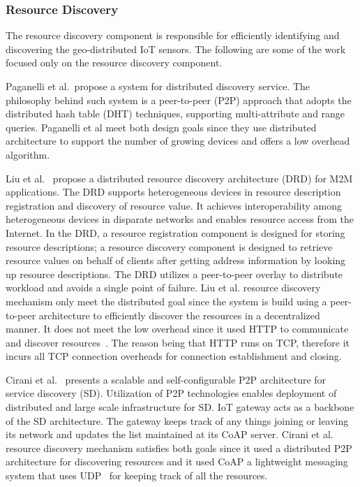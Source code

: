 


\subsubsection{Resource Discovery}
The resource discovery component is responsible for efficiently identifying and discovering the geo-distributed IoT sensors. 
The following are some of the work focused only on the resource discovery component. 

Paganelli et al.~\cite{article}propose a system for distributed discovery service. The philosophy behind such system is a peer-to-peer (P2P) approach that adopts the distributed hash table (DHT) techniques, supporting multi-attribute and range queries. Paganelli et al meet both design goals since they use distributed architecture to support the number of growing devices and offers a low overhead algorithm.

Liu et al.~\cite{6680268} propose a distributed resource discovery architecture (DRD) for M2M applications. The DRD supports
heterogeneous devices in resource description registration and discovery of resource value. It achieves interoperability among
heterogeneous devices in disparate networks and enables resource access from the Internet. In the DRD, a resource registration component is designed for storing resource descriptions; a resource discovery component is designed to retrieve resource values on behalf of clients after getting address information by looking up resource descriptions. The DRD utilizes a peer-to-peer overlay to distribute workload and avoids a single point of failure. Liu et al. resource discovery mechanism only meet the distributed goal since the system is build using a peer-to-peer architecture to efficiently discover the resources in a decentralized manner. It does not meet the low overhead since it used HTTP to communicate and discover resources~\cite{8088251}. The reason being that HTTP runs on TCP, therefore it incurs all TCP connection overheads for connection establishment and closing.

Cirani et al.~\cite{6899579} presents a scalable and self-configurable P2P architecture for service discovery (SD). Utilization of
P2P technologies enables deployment of distributed and large scale infrastructure for SD. IoT gateway acts as a backbone of the SD architecture. The gateway keeps track of any things joining or leaving its network and updates the list maintained at its CoAP server. Cirani et al. resource discovery mechanism satisfies both goals since it used a distributed P2P architecture for discovering resources and it used CoAP a lightweight messaging system that uses UDP~\cite{8088251} for keeping track of all the resources.

